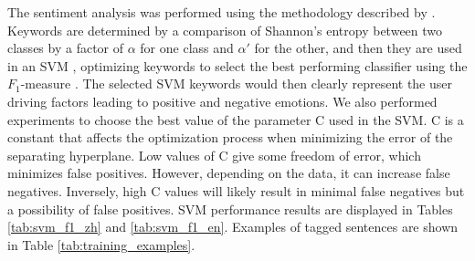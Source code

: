 \documentclass[smallextended,natbib]{svjour3}       %
\begin{document}
    The sentiment analysis was performed using the methodology described by \cite{Aleman2018ICAROB}. Keywords are determined by a comparison of Shannon's entropy \cite[][]{shannon1948} between two classes by a factor of \(\alpha\) for one class and \(\alpha'\) for the other, and then they are used in an SVM \cite[][]{cortes1995}, optimizing keywords to select the best performing classifier using the \(F_1\)-measure \cite[][]{powers2011}. The selected SVM keywords would then clearly represent the user driving factors leading to positive and negative emotions. We also performed experiments to choose the best value of the parameter C used in the SVM. C is a constant that affects the optimization process when minimizing the error of the separating hyperplane. Low values of C give some freedom of error, which minimizes false positives. However, depending on the data, it can increase false negatives. Inversely, high C values will likely result in minimal false negatives but a possibility of false positives. SVM performance results are displayed in  Tables \ref{tab:svm_f1_zh} and \ref{tab:svm_f1_en}. Examples of tagged sentences are shown in Table \ref{tab:training_examples}. 
\end{document}
